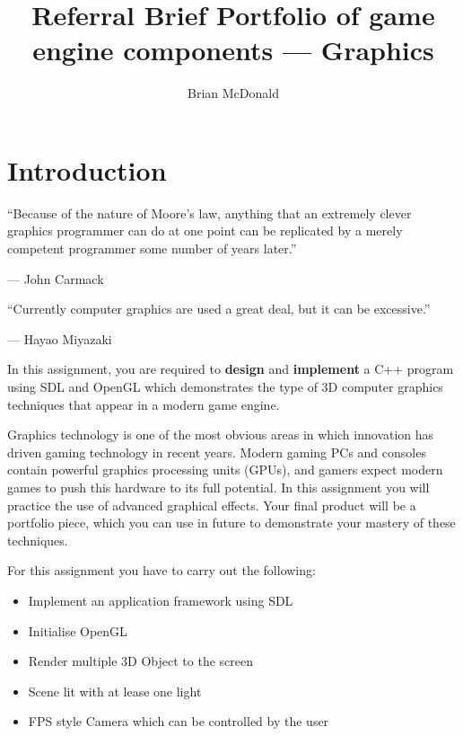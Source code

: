 \documentclass{../../fal_assignment}
\title{Referral Brief Portfolio of game engine components --- Graphics}
\author{Brian McDonald}
\begin{document}
\maketitle

\section*{Introduction}

\begin{marginquote}
``Because of the nature of Moore's law, anything that an extremely clever graphics programmer can do at one point can be replicated by a merely competent programmer some number of years later.''

--- John Carmack

    \marginquoterule

``Currently computer graphics are used a great deal, but it can be excessive.''

--- Hayao Miyazaki
\end{marginquote}

In this assignment, you are required to \textbf{design} and \textbf{implement} a C++ program using SDL and OpenGL
which demonstrates the type of 3D computer graphics techniques that appear in a modern game engine.

Graphics technology is one of the most obvious areas in which innovation has driven gaming technology in recent years.
Modern gaming PCs and consoles contain powerful graphics processing units (GPUs),
and gamers expect modern games to push this hardware to its full potential.
In this assignment you will practice the use of advanced graphical effects.
Your final product will be a portfolio piece, which you can use in future to demonstrate your mastery of these techniques.

For this assignment you have to carry out the following:
\begin{itemize}
	\item Implement an application framework using SDL
	\item Initialise OpenGL
	\item Render multiple 3D Object to the screen
	\item Scene lit with at lease one light
	\item FPS style Camera which can be controlled by the user
\end{itemize}
\end{document}
